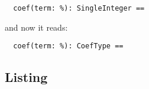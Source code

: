 \begin{small}
\begin{verbatim}
  coef(term: %): SingleInteger ==                         
\end{verbatim}
\end{small}

and now it reads:

\begin{small}
\begin{verbatim}
  coef(term: %): CoefType ==                         
\end{verbatim}
\end{small}

\subsection{Listing}

\label{ParamTypesListing}


